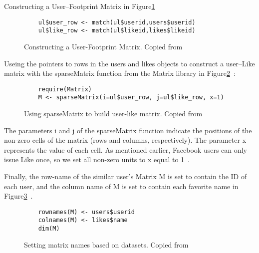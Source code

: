 Constructing a User–Footprint Matrix in Figure\ref{F:footprintmatrix}

\begin{figure}[htb]
\begin{footnotesize}
\begin{verbatim}
    ul$user_row <- match(ul$userid,users$userid)
    ul$like_row <- match(ul$likeid,likes$likeid)
\end{verbatim}
\end{footnotesize}
\caption{Constructing a User-Footprint Matrix. 
Copied from~\cite{hid515-12}}
\label{F:footprintmatrix}
\end{figure}


Useing the pointers to rows in the users and likes objects to 
construct a user–Like matrix with the sparseMatrix 
function from the Matrix
 library in Figure\ref{F:sparseMatrix}~\cite{hid515-12}:

\begin{figure}[htb]
\begin{footnotesize}
\begin{verbatim}
    require(Matrix)
    M <- sparseMatrix(i=ul$user_row, j=ul$like_row, x=1)
\end{verbatim}
\end{footnotesize}
\caption{Using sparseMatrix to build user-like matrix. 
Copied from~\cite{hid515-12}}
\label{F:sparseMatrix}
\end{figure}


The parameters i and j of the sparseMatrix function indicate the 
positions of the non-zero cells of the matrix (rows and columns, 
respectively). The parameter x represents the value of each cell. 
As mentioned earlier, Facebook users can only issue Like once, so 
we set all non-zero units to x equal to 1~\cite{hid515-12}.

Finally, the row-name of the similar user's Matrix M is set to 
contain the ID of each user, and the column name of M is set to 
contain each favorite name in 
Figure\ref{F:setting names}~\cite{hid515-12}.

\begin{figure}[htb]
\begin{footnotesize}
\begin{verbatim}
    rownames(M) <- users$userid
    colnames(M) <- likes$name
    dim(M)
\end{verbatim}
\end{footnotesize}
\caption{Setting matrix names based on datasets. 
Copied from~\cite{hid515-12}}
\label{F:setting names}
\end{figure}


